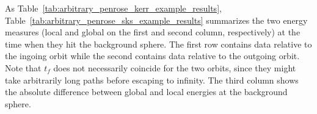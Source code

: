 As Table~\ref{tab:arbitrary_penrose_kerr_example_results}, Table~\ref{tab:arbitrary_penrose_sks_example_results} summarizes the two energy measures (local and global on the first and second column, respectively) at the time when they hit the background sphere. The first row contains data relative to the ingoing orbit while the second contains data relative to the outgoing orbit. Note that $t_f$ does not necessarily coincide for the two orbits, since they might take arbitrarily long paths before escaping to infinity. The third column shows the absolute difference between global and local energies at the background sphere.
%
\begin{table}[]
  \centering
  \caption{Energy measures at the time of collision with the background sphere. The first and second row represent the ingoing and the outgoing orbits, respectively. The third column shows the absolute difference between energy measures at the background sphere radius. Note that $t_f$ is not necessarily the same for both trajectories.}
  \label{tab:arbitrary_penrose_sks_example_results}
\end{table}

